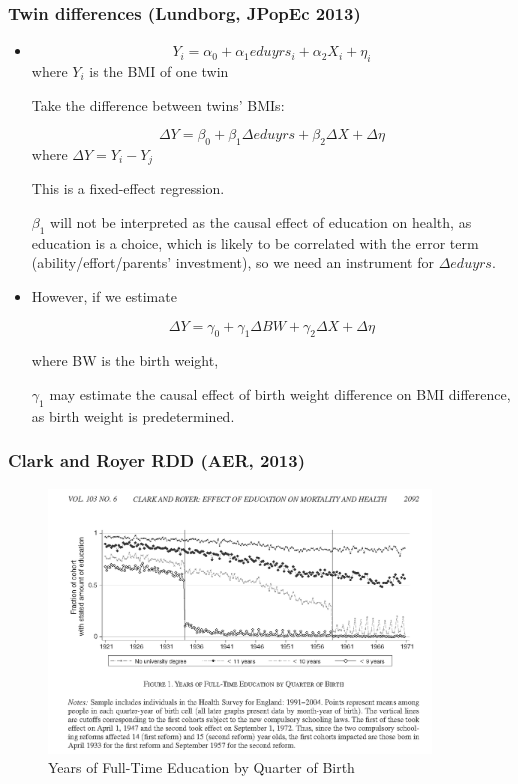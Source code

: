 \subsubsection{Twin differences (Lundborg, JPopEc 2013)}
\begin{itemize}
        \item $$Y_i = \alpha_0+\alpha_1 eduyrs_i+\alpha_2 X_i+\eta_i$$
        where  $Y_i$ is the BMI of one twin

Take the difference between twins' BMIs:

$$\Delta Y = \beta_0+\beta_1\Delta eduyrs+\beta_2 \Delta X+\Delta \eta$$
where  $\Delta Y=Y_i-Y_j$ 

This is a fixed-effect regression.

$\beta_1$ will not be interpreted as the causal effect of education on health, as education is a choice, which is likely to be correlated with the error term (ability/effort/parents' investment), so we need an instrument for $\Delta eduyrs$.

\item However, if we estimate

$$\Delta Y = \gamma_0+\gamma_1\Delta BW+\gamma_2 \Delta X+\Delta \eta$$

where BW is the birth weight,

$\gamma_1$ may estimate the causal effect of birth weight difference on BMI difference, as birth weight is predetermined.
\end{itemize} 

\subsubsection{Clark and Royer RDD (AER, 2013)}
\begin{figure}[H]%
                \centering
                \includegraphics[width=4in]{images/ch3/35.png}
                \caption{Years of Full-Time Education by Quarter of Birth}
                \label{fig:label}
            \end{figure}
            
